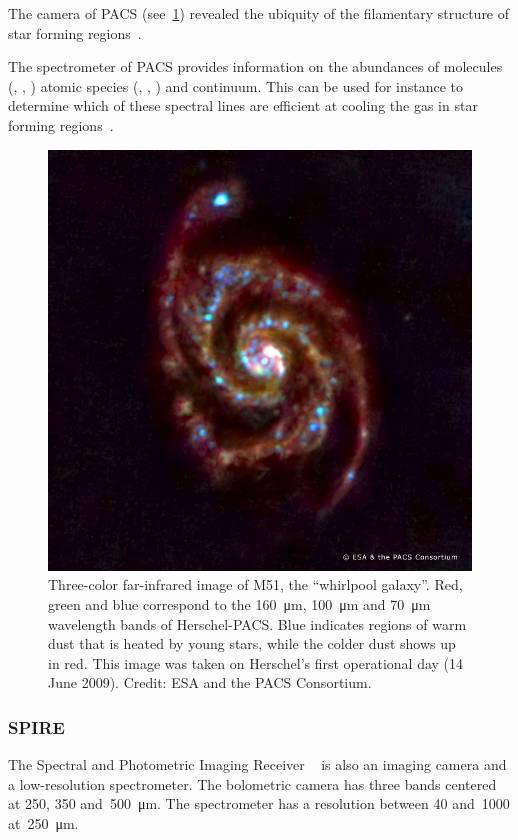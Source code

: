 The camera of PACS (see~\cref{fig:m51_pacs_composite}) revealed the ubiquity of the filamentary structure of star forming regions~\autocite{2010A&A...518L.100M}.

The spectrometer of PACS provides information on the abundances of molecules
(, , ) atomic species (, , ) and continuum.
This can be used for instance to determine which of these spectral lines are efficient at cooling the gas in star forming regions~\autocite{2013A&A...552A.141K}.

\begin{figure}
    \centering
    \includegraphics[width=.6\textwidth]{m51_pacs_composite}
    \caption{
        Three-color far-infrared image of M51, the ``whirlpool galaxy''.
        Red, green and blue correspond to the \SI{160}{\micro\meter}, \SI{100}{\micro\meter} and \SI{70}{\micro\meter} wavelength bands
        of Herschel-PACS.
        Blue indicates regions of warm dust that is heated by young stars, while the colder dust shows up in red.
        This image was taken on Herschel's first operational day (14 June 2009).
        Credit: ESA and the PACS Consortium.
    }
    \label{fig:m51_pacs_composite}
\end{figure}

\subsubsection{SPIRE}
The Spectral and Photometric Imaging Receiver%
~\cite{griffin2010herschel}
is also an imaging camera and a low-resolution spectrometer.
The bolometric camera has three bands centered at \num{250}, \num{350} and~\SI{500}{\micro\meter}.
The spectrometer has a resolution between \num{40} and~\num{1000} at~\SI{250}{\micro\meter}.

